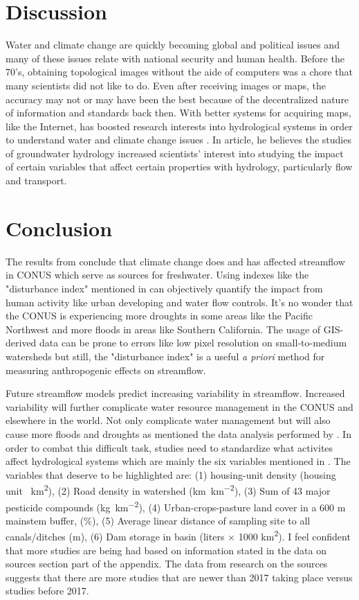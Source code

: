 \documentclass[a4paper,man,biblatex]{apa7}
\begin{document}
\section{Discussion} Water and climate change are quickly becoming global and political issues and many of these issues relate with national security and human health. Before the 70's, obtaining topological images without the aide of computers was a chore that many scientists did not like to do. Even after receiving images or maps, the accuracy may not or may have been the best because of the decentralized nature of information and standards back then. With better systems for acquiring maps, like the Internet, has boosted research interests into hydrological systems in order to understand water and climate change issues \autocite{bras_1999}. In \textcite{bras_1999} article, he believes the studies of groundwater hydrology increased scientists' interest into studying the impact of certain variables that affect certain properties with hydrology, particularly flow and transport.\\
\section{Conclusion} The results from \textcite{rice_2016} conclude that climate change does and has affected streamflow in CONUS which serve as sources for freshwater. Using indexes like the "disturbance index" mentioned in \textcite{falcone_2016} can objectively quantify the impact from human activity like urban developing and water flow controls. It's no wonder that the CONUS is experiencing more droughts in some areas like the Pacific Northwest and more floods in areas like Southern California. The usage of GIS-derived data can be prone to errors like low pixel resolution on small-to-medium watersheds but still, the "disturbance index" is a useful \textit{a priori} method for measuring anthropogenic effects on streamflow. 
\par Future streamflow models predict increasing variability in streamflow. Increased variability will further complicate  water resource management in the CONUS and elsewhere in the world. Not only complicate water management but will also cause more floods and droughts as mentioned the data analysis performed by \textcite{mallakpour_2018}. In order to combat this difficult task, studies need to standardize what activites affect hydrological systems which are mainly the six variables mentioned in \textcite{rice_2016}. The variables that deserve to be highlighted are: (1) housing-unit density (housing unit \si{\per\square\kilo\meter}), (2) Road density in watershed (\si{\kilo\meter\per\square\kilo\meter}), (3) Sum of 43 major pesticide compounds (\si{\kilo\gram\per\square\kilo\meter}), (4) Urban-crops-pasture land cover in a 600 m mainstem buffer, (\%), (5) Average linear distance of sampling site to all canals/ditches (m), (6) Dam storage in basin (liters $\times$ 1000 \si{\square\kilo\meter}). I feel confident that more studies are being had based on information stated in the data on sources section part of the appendix. The data from research on the sources suggests that there are more studies that are newer than 2017 taking place versus studies before 2017.
\end{document}
